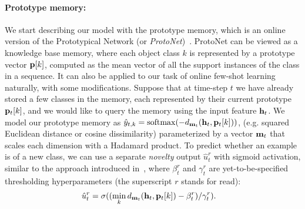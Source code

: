 \vspace{-0.1in} \paragraph{Prototype memory:} We start describing our model with the prototype
memory, which is an online version of the Prototypical Network (or
\emph{ProtoNet})~\citep{protonet}. ProtoNet can be viewed as a knowledge base memory, where each
object class $k$ is represented by a prototype vector $\mathbf{p}[k]$, computed as the mean vector of all
the support instances of the class in a sequence. It can also be applied to our task of online
few-shot learning naturally, with some modifications. Suppose that at time-step $t$ we have already
stored a few classes in the memory, each represented by their current prototype $\mathbf{p}_t[k]$, and we
would like to query the memory using the input feature $\mathbf{h}_t$. We model our prototype memory as %
$\hat{y}_{t,k} = \mathrm{softmax}( -d_{\mathbf{m}_t}(\mathbf{h}_t, \mathbf{p}_t[k]))$, %
(e.g. squared Euclidean distance or cosine dissimilarity) parameterized by a vector $\mathbf{m}_t$ that
scales each dimension with a Hadamard product. To predict whether an example is of a new class, we
can use a separate \emph{novelty} output $\hat{u}_t^{r}$ with sigmoid activation, similar to the
approach introduced in~\citet{fewshotssl}, where $\beta_t^r$ and $\gamma_t^r$ are
yet-to-be-specified thresholding hyperparameters (the superscript $r$ stands for read): 
\vskip -0.5cm 
\begin{align}
\hat{u}_t^{r} &= \sigma( (\min_k d_{\mathbf{m}_t}(\mathbf{h}_t, \mathbf{p}_t[k]) - \beta_t^r) /
\gamma_t^r).
\label{eq:ur}
\end{align}
\vskip -0.25cm


\vspace{-0.1in}
